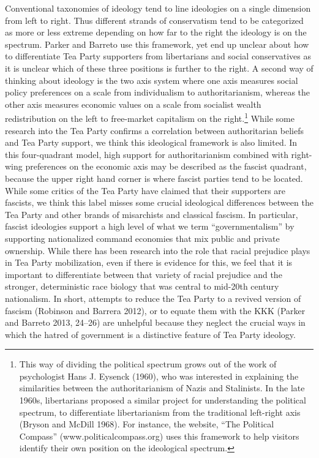 \documentclass[12pt,]{article}
\let\rmarkdownfootnote\footnote%
\def\footnote{\protect\rmarkdownfootnote}
\begin{document}
Conventional taxonomies of ideology tend to line ideologies on a single
dimension from left to right. Thus different strands of conservatism
tend to be categorized as more or less extreme depending on how far to
the right the ideology is on the spectrum. Parker and Barreto use this
framework, yet end up unclear about how to differentiate Tea Party
supporters from libertarians and social conservatives as it is unclear
which of these three positions is further to the right. A second way of
thinking about ideology is the two axis system where one axis measures
social policy preferences on a scale from individualism to
authoritarianism, whereas the other axis measures economic values on a
scale from socialist wealth redistribution on the left to free-market
capitalism on the right.\footnote{This way of dividing the political
  spectrum grows out of the work of psychologist Hans J. Eysenck (1960),
  who was interested in explaining the similarities between the
  authoritarianism of Nazis and Stalinists. In the late 1960s,
  libertarians proposed a similar project for understanding the
  political spectrum, to differentiate libertarianism from the
  traditional left-right axis (Bryson and McDill 1968). For instance,
  the website, ``The Political Compass'' (www.politicalcompass.org) uses
  this framework to help visitors identify their own position on the
  ideological spectrum.} While some research into the Tea Party confirms
a correlation between authoritarian beliefs and Tea Party support, we
think this ideological framework is also limited. In this four-quadrant
model, high support for authoritarianism combined with right-wing
preferences on the economic axis may be described as the fascist
quadrant, because the upper right hand corner is where fascist parties
tend to be located. While some critics of the Tea Party have claimed
that their supporters are fascists, we think this label misses some
crucial ideological differences between the Tea Party and other brands
of misarchists and classical fascism. In particular, fascist ideologies
support a high level of what we term ``governmentalism'' by supporting
nationalized command economies that mix public and private ownership.
While there has been research into the role that racial prejudice plays
in Tea Party mobilization, even if there is evidence for this, we feel
that it is important to differentiate between that variety of racial
prejudice and the stronger, deterministic race biology that was central
to mid-20th century nationalism. In short, attempts to reduce the Tea
Party to a revived version of fascism (Robinson and Barrera 2012), or to
equate them with the KKK (Parker and Barreto 2013, 24--26) are unhelpful
because they neglect the crucial ways in which the hatred of government
is a distinctive feature of Tea Party ideology.
\end{document}
